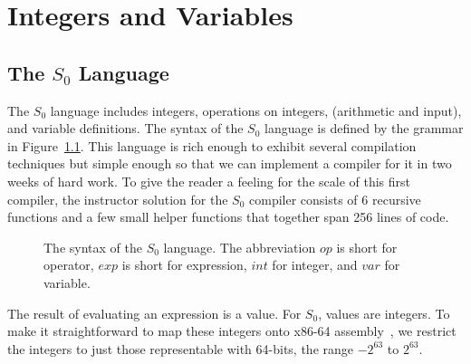 \documentclass[12pt]{book}
\makeatletter
\newenvironment{chapquote}[2][2em]
  {\setlength{\@tempdima}{#1}%
   \def\chapquote@author{#2}%
   \parshape 1 \@tempdima \dimexpr\textwidth-2\@tempdima\relax%
   \itshape}
  {\par\normalfont\hfill--\ \chapquote@author\hspace*{\@tempdima}\par\bigskip}
\newcommand{\itm}[1]{\ensuremath{\mathit{#1}}}
\newcommand{\Exp}{\itm{exp}}
\newcommand{\Int}{\itm{int}}
\newcommand{\Var}{\itm{var}}
\newcommand{\Op}{\itm{op}}
\newcommand{\key}[1]{\texttt{#1}}
\newcommand{\LET}[3]{(\key{let}\,([#1\;#2])\,#3)}
\makeatother
\begin{document}

\chapter{Integers and Variables}
\label{ch:int-exp}


\section{The $S_0$ Language}

The $S_0$ language includes integers, operations on integers,
(arithmetic and input), and variable definitions.  The syntax of the
$S_0$ language is defined by the grammar in
Figure~\ref{fig:s0-syntax}. This language is rich enough to exhibit
several compilation techniques but simple enough so that we can
implement a compiler for it in two weeks of hard work.  To give the
reader a feeling for the scale of this first compiler, the instructor
solution for the $S_0$ compiler consists of 6 recursive functions and
a few small helper functions that together span 256 lines of code.

\begin{figure}[htbp]
\centering
\fbox{
\begin{minipage}{0.85\textwidth}
\[
\begin{array}{lcl}
  \Op  &::=& \key{+} \mid \key{-} \mid \key{*} \mid \key{read} \\
  \Exp &::=& \Int \mid (\Op \; \Exp^{*}) \mid \Var \mid \LET{\Var}{\Exp}{\Exp}
\end{array}
\]
\end{minipage}
}
\caption{The syntax of the $S_0$ language. The abbreviation \Op{} is
  short for operator, \Exp{} is short for expression, \Int{} for integer,
  and \Var{} for variable.}
\label{fig:s0-syntax}
\end{figure}

The result of evaluating an expression is a value.  For $S_0$, values
are integers. To make it straightforward to map these integers onto
x86-64 assembly~\citep{Matz:2013aa}, we restrict the integers to just
those representable with 64-bits, the range $-2^{63}$ to $2^{63}$.
\end{document}
